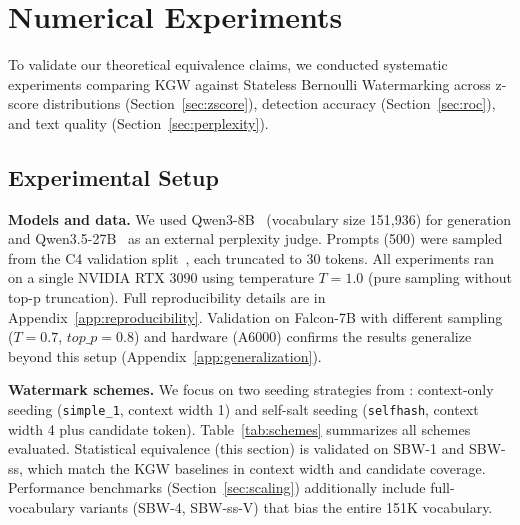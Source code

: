 \documentclass[11pt]{article}
\begin{document}
\section{Numerical Experiments}
\label{sec:experiments}

To validate our theoretical equivalence claims, we conducted systematic experiments comparing KGW against Stateless Bernoulli Watermarking across z-score distributions (Section~\ref{sec:zscore}), detection accuracy (Section~\ref{sec:roc}), and text quality (Section~\ref{sec:perplexity}).

\subsection{Experimental Setup}

\textbf{Models and data.} We used Qwen3-8B~\cite{yang2025qwen3} (vocabulary size 151,936) for generation and Qwen3.5-27B~\cite{qwen2025qwen35omni} as an external perplexity judge. Prompts (500) were sampled from the C4 validation split~\cite{raffel2020exploring}, each truncated to 30 tokens. All experiments ran on a single NVIDIA RTX 3090 using temperature $T=1.0$ (pure sampling without top-p truncation). Full reproducibility details are in Appendix~\ref{app:reproducibility}. Validation on Falcon-7B with different sampling ($T{=}0.7$, $top\_p{=}0.8$) and hardware (A6000) confirms the results generalize beyond this setup (Appendix~\ref{app:generalization}).

\textbf{Watermark schemes.} We focus on two seeding strategies from \citet{kirchenbauer2023watermark}: context-only seeding (\texttt{simple\_1}, context width 1) and self-salt seeding (\texttt{selfhash}, context width 4 plus candidate token). Table~\ref{tab:schemes} summarizes all schemes evaluated. Statistical equivalence (this section) is validated on SBW-1 and SBW-ss, which match the KGW baselines in context width and candidate coverage. Performance benchmarks (Section~\ref{sec:scaling}) additionally include full-vocabulary variants (SBW-4, SBW-ss-V) that bias the entire 151K vocabulary.
\end{document}
